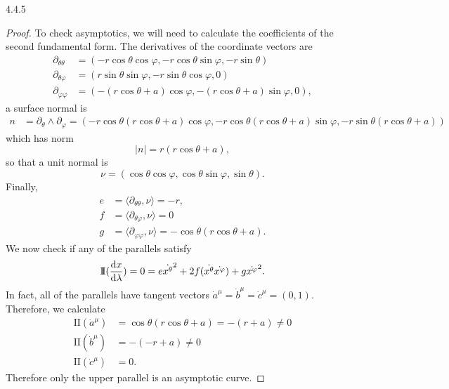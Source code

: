 \documentclass[11pt]{article}
\begin{document}
\begin{problem}{4.4.5}
\begin{proof}
To check asymptotics, we will need to calculate the coefficients of the second fundamental form.
The derivatives of the coordinate vectors are
\begin{equation}
\label{eq:16}
\begin{aligned}
  \partial_{\theta\theta} &= (-r\cos\theta\cos\varphi, -r\cos\theta\sin\varphi, -r\sin\theta) \\
  \partial_{\theta \varphi} &= (r\sin\theta\sin\varphi, -r\sin\theta\cos\varphi, 0) \\
  \partial_{\varphi\varphi} &= (-(r\cos\theta + a)\cos\varphi, -(r\cos\theta + a)\sin\varphi, 0),
\end{aligned}
\end{equation}
a surface normal is
\begin{equation}
\label{eq:17}
\begin{aligned}
  n &= \partial_{\theta} \wedge \partial_{\varphi} = \left( -r\cos\theta(r\cos\theta + a)\cos\varphi, -r\cos\theta(r\cos\theta+a)\sin\varphi, -r\sin\theta(r\cos\theta + a) \right)
\end{aligned}
\end{equation}
which has norm
\begin{equation}
\label{eq:18}
|n| = r(r\cos\theta + a),
\end{equation}
so that a unit normal is
\begin{equation}
\label{eq:19}
\nu = (\cos\theta\cos\varphi, \cos\theta\sin\varphi, \sin\theta).
\end{equation}
Finally,
\begin{equation}
\label{eq:20}
\begin{aligned}
  e &= \langle \partial_{\theta\theta}, \nu \rangle = -r, \\
  f &= \langle \partial_{\theta\varphi}, \nu \rangle = 0 \\
  g &= \langle \partial_{\varphi\varphi}, \nu \rangle = -\cos\theta(r\cos\theta + a).
\end{aligned}
\end{equation}
We now check if any of the parallels satisfy
\begin{equation}
\label{eq:21}
\mathrm{I \!I}(\dv{x}{\lambda}) = 0 = e \dot{x^{\theta}}^2 + 2f(\dot{x^{\theta}}\dot{x^{\varphi}}) + g \dot{x^{\varphi}}^2.
\end{equation}
In fact, all of the parallels have tangent vectors \( \dot{a}^{\mu} = \dot{b}^{\mu} = \dot{c}^{\mu} = (0,1) \).
Therefore, we calculate
\begin{equation}
\label{eq:22}
\begin{aligned}
  \mathrm{I \!I}(\dot{a}^{\mu}) &= \cos\theta(r\cos\theta + a) = -(r + a) \neq 0 \\
  \mathrm{I \!I}(\dot{b}^{\mu}) &= -(-r + a) \neq 0 \\
  \mathrm{I \!I}(\dot{c}^{\mu}) &= 0.
\end{aligned}
\end{equation}
Therefore only the upper parallel is an asymptotic curve.


\end{proof}
\end{problem}
\end{document}
